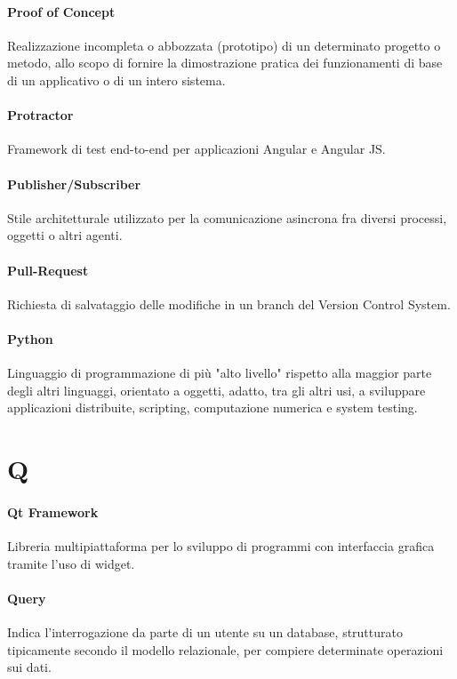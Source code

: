 \documentclass[]{article}
\begin{document}
	\paragraph*{Proof of Concept}
	Realizzazione incompleta o abbozzata (prototipo) di un determinato progetto o metodo, allo scopo di fornire la dimostrazione pratica dei funzionamenti di base di un applicativo o di un intero sistema.

	\paragraph*{Protractor}
	Framework di test end-to-end per applicazioni Angular e Angular JS.

	\paragraph*{Publisher/Subscriber}
	Stile architetturale utilizzato per la comunicazione asincrona fra diversi processi, oggetti o altri agenti.

	\paragraph*{Pull-Request}
	Richiesta di salvataggio delle modifiche in un branch del Version Control System.

	\paragraph*{Python}
	Linguaggio di programmazione di più "alto livello" rispetto alla maggior parte degli altri linguaggi, orientato a oggetti, adatto, tra gli altri usi, a sviluppare applicazioni distribuite, scripting, computazione numerica e system testing.

	\newpage

	\section*{Q}

	\paragraph*{Qt Framework}
	Libreria multipiattaforma per lo sviluppo di programmi con interfaccia grafica tramite l'uso di widget.

	\paragraph*{Query}
	Indica l'interrogazione da parte di un utente su un database, strutturato tipicamente secondo il modello relazionale, per compiere determinate operazioni sui dati.
\end{document}
